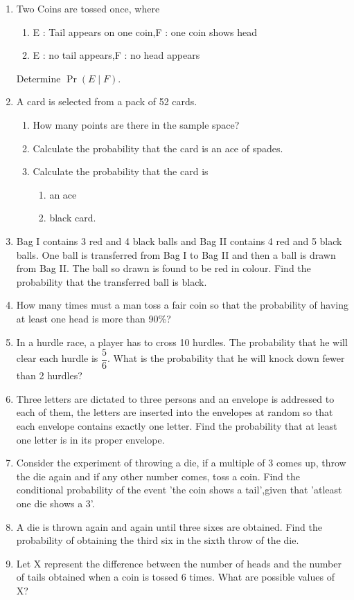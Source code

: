 \providecommand{\pr}[1]{\ensuremath{\Pr\left(#1\right)}}
\begin{enumerate}[label=\thechapter.\arabic*,ref=\thechapter.\theenumi]
\item 
Two Coins are tossed once, where
\begin{enumerate}
\item  E : Tail appears on one coin,\qquad F : one coin shows head
\item  E : no tail appears,\qquad\qquad\qquad F : no head appears
\end{enumerate}
Determine \pr{E\mid F}.
\item A card is selected from a pack of 52 cards.
\begin{enumerate}
\item How many points are there in the sample space?
\item Calculate the probability that the card is an ace of spades.
\item Calculate the probability that the card is 
           \begin{enumerate}
           \item an ace
           \item black card.
           \end{enumerate}
\end{enumerate}
\item Bag I contains 3 red and 4 black balls and Bag II contains 4 red and 5 black balls.
One ball is transferred from Bag I to Bag II and then a ball is drawn from Bag II.
The ball so drawn is found to be red in colour. Find the probability that the
transferred ball is black.
\item How many times must a man toss a fair coin so that the probability of having
at least one head is more than 90\%?
\item In a hurdle race, a player has to cross 10 hurdles. The probability that he will clear each hurdle is $\dfrac{5}{6}$. What is the probability that he will knock down fewer than 2 hurdles?
\item Three letters are dictated to three persons and an envelope is addressed to each
of them, the letters are inserted into the envelopes at random so that each envelope
contains exactly one letter. Find the probability that at least one letter is in its
proper envelope.
\item Consider the experiment of throwing a die, if a multiple of 3 comes up, throw the die again and if any other number comes, toss a coin. Find the conditional probability of the event 'the coin shows a tail',given that 'atleast one die shows a 3'.
\item A die is thrown again and again until three sixes are obtained. Find the probability of obtaining the third six in the sixth throw of the die.
\item Let X represent the difference between the number of heads and the number of
tails obtained when a coin is tossed 6 times. What are possible values of X?
\end{enumerate}
